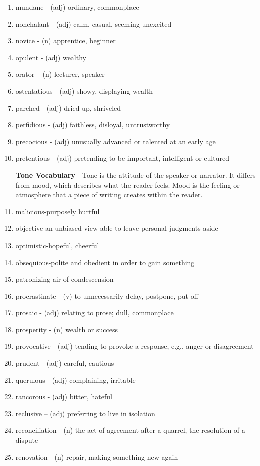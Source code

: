 \documentclass[12pt]{book}
\begin{document}
\begin{enumerate}
\bigskip
\item mundane - (adj) ordinary, commonplace
\item nonchalant - (adj) calm, casual, seeming unexcited
\item novice - (n) apprentice, beginner
\item opulent - (adj) wealthy
\item orator – (n) lecturer, speaker
\item ostentatious - (adj) showy, displaying wealth
\item parched - (adj) dried up, shriveled
\item perfidious - (adj) faithless, disloyal, untrustworthy
\item precocious - (adj) unusually advanced or talented at an early age
\item pretentious - (adj) pretending to be important, intelligent or cultured

\bigskip
\textbf{Tone Vocabulary} - Tone is the attitude of the speaker or narrator.  It differs from mood, which describes what the reader feels.  Mood is the feeling or atmosphere that a piece of writing creates within the reader.  

\bigskip
\item malicious-purposely hurtful
\item objective-an unbiased view-able to leave personal judgments aside
\item optimistic-hopeful, cheerful
\item obsequious-polite and obedient in order to gain something
\item patronizing-air of condescension 

\bigskip
\item procrastinate - (v) to unnecessarily delay, postpone, put off
\item prosaic - (adj) relating to prose; dull, commonplace
\item prosperity - (n) wealth or success
\item provocative - (adj) tending to provoke a response, e.g., anger or disagreement
\item prudent - (adj) careful, cautious
\item querulous - (adj) complaining, irritable
\item rancorous - (adj) bitter, hateful
\item reclusive – (adj) preferring to live in isolation
\item reconciliation - (n) the act of agreement after a quarrel, the resolution of a dispute
\item renovation - (n) repair, making something new again


\end{enumerate}
\end{document}
